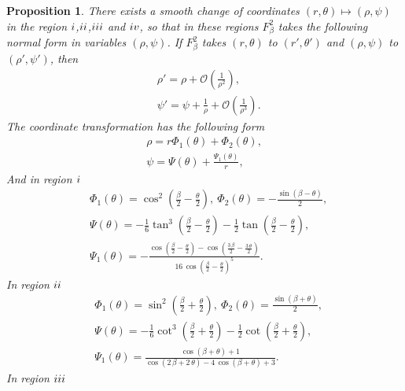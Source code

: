 \documentclass{article}
\def \Rone{\uppercase\expandafter{\romannumeral1}}
\def \Rtwo{\uppercase\expandafter{\romannumeral2}}
\def \Rthree{\uppercase\expandafter{\romannumeral3}}
\def \Rfour{\uppercase\expandafter{\romannumeral4}}
\numberwithin{figure}{section}
\numberwithin{equation}{section}
\newtheorem{proposition}[lemma]{Proposition}
\theoremstyle{remark}
\theoremstyle{definition}
\begin{document}
\begin{proposition}\label{Finding rho and psi}
	There exists a smooth change of coordinates $(r,\theta)\mapsto(\rho,\psi)$ in the region $\Rone$,$\Rtwo$,$\Rthree$ and $\Rfour$, so that in these regions $F_\beta^2$ takes the following normal form in variables $\left(\rho,\psi\right)$. If $F^2_\beta$ takes $(r,\theta)$ to $(r',\theta')$ and $(\rho,\psi)$ to $(\rho',\psi')$, then
	\begin{align}
		&\rho'=\rho+\mathcal{O}\left(\frac{1}{\rho^2}\right),\\
		&\psi'=\psi+\frac{1}{\rho}+\mathcal{O}\left(\frac{1}{\rho^3}\right).
	\end{align}
	The coordinate transformation has the following form
	\begin{align*}
		\rho=r\Phi_1(\theta)+\Phi_2(\theta),\\
		\psi=\Psi(\theta)+\frac{\Psi_1(\theta)}{r},
	\end{align*}
	And in region $\Rone$
	\begin{equation}\label{explicit_form1}
		\begin{split}
			& \Phi_1(\theta)=\cos^2\left(\frac{\beta}{2}-\frac{\theta}{2}\right), \ \Phi_2(\theta)=-\frac{\sin(\beta-\theta)}{2},\\
			&\Psi(\theta)=-\frac{1}{6}\tan^3\left(\frac{\beta}{2}-\frac{\theta}{2}\right)-\frac{1}{2}\tan\left(\frac{\beta}{2}-\frac{\theta}{2}\right),\\
                &\Psi_1(\theta)=-\frac{\cos \left(\frac{\beta }{2}-\frac{\theta}{2}\right)-\cos \left(\frac{3\,\beta }{2}-\frac{3\,\theta}{2}\right)}{16\,{\cos \left(\frac{\beta }{2}-\frac{\theta}{2}\right)}^5 }.
		\end{split}
	\end{equation}
        In region $\Rtwo$
	\begin{equation}\label{explicit_form2}
		\begin{split}
			& \Phi_1(\theta)=\sin^2\left(\frac{\beta}{2}+\frac{\theta}{2}\right), \ \Phi_2(\theta)=\frac{\sin(\beta+\theta)}{2},\\
			&\Psi(\theta)=-\frac{1}{6}\cot^3\left(\frac{\beta}{2}+\frac{\theta}{2}\right)-\frac{1}{2}\cot\left(\frac{\beta}{2}+\frac{\theta}{2}\right),\\
                &\Psi_1(\theta)=\frac{\cos \left(\beta +\theta\right)+1}{\cos \left(2\,\beta +2\,\theta\right)-4\,\cos \left(\beta +\theta\right)+3}.
		\end{split}
	\end{equation}
        In region $\Rthree$

\end{proposition}
\end{document}
